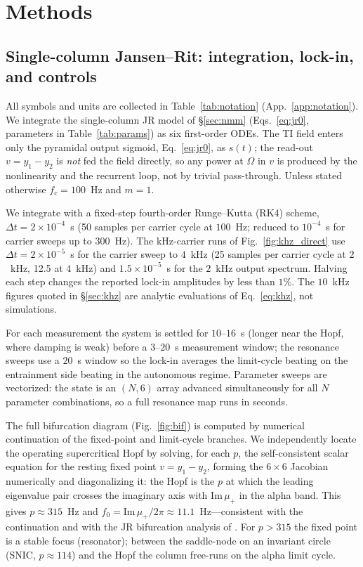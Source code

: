 \documentclass[11pt,a4paper]{article}
\providecommand{\DIFaddtex}[1]{{\protect\color{blue} \sf #1}} %
\providecommand{\DIFdeltex}[1]{{\protect\color{red} \scriptsize #1}} %
\providecommand{\DIFaddbegin}{} %
\providecommand{\DIFaddend}{} %
\providecommand{\DIFdelbegin}{} %
\providecommand{\DIFdelend}{} %
\providecommand{\DIFadd}[1]{\texorpdfstring{\DIFaddtex{#1}}{#1}} %
\providecommand{\DIFdel}[1]{\texorpdfstring{\DIFdeltex{#1}}{}} %
\begin{document}

\section{Methods}

\subsection{Single-column Jansen--Rit: integration, lock-in, and controls}
All symbols and units are collected in Table~\ref{tab:notation}
(App.~\ref{app:notation}). We integrate the single-column JR model of \S\ref{sec:nmm}
(Eqs.~\eqref{eq:jr0}, parameters in Table~\ref{tab:params}) as six first-order
ODEs. The TI field enters only the pyramidal output sigmoid, Eq.~\eqref{eq:jr0},
as $s(t)$; the read-out $v=y_1-y_2$ is \emph{not} fed the field directly, so any
power at $\Omega$ in $v$ is produced by the nonlinearity and the recurrent loop,
not by trivial pass-through. Unless stated otherwise $f_c=100$~Hz and $m=1$.

We integrate with a fixed-step fourth-order Runge--Kutta (RK4) scheme,
$\Delta t=2\times10^{-4}$~s (50 samples per carrier cycle at $100$~Hz; reduced to
$10^{-4}$~s for carrier sweeps up to $300$~Hz). The kHz-carrier runs of
Fig.~\ref{fig:khz_direct} use $\Delta t=2\times10^{-5}$~s for the carrier sweep to
$4$~kHz (25 samples per carrier cycle at $2$~kHz, 12.5 at $4$~kHz) and
$1.5\times10^{-5}$~s for the $2$~kHz output spectrum. Halving each step changes the
reported lock-in amplitudes by less than $1\%$. The $10$~kHz figures quoted in
\S\ref{sec:khz} are analytic evaluations of Eq.~\eqref{eq:khz}, not simulations.

For each measurement the system is settled for $10$--$16$~s (longer near the Hopf, where damping is weak) before a
$3$--$20$~s measurement window; the resonance sweeps use a $20$~s window so the
lock-in averages the \DIFdelbegin \DIFdel{limit-cycle beating on the entrainment side}\DIFdelend \DIFaddbegin \DIFadd{beating in the autonomous regime}\DIFaddend . Parameter
sweeps are vectorized: the state is an
$(N,6)$ array advanced simultaneously for all $N$ parameter combinations, so a full
resonance map runs in seconds.

The full bifurcation diagram (Fig.~\ref{fig:bif}) is computed by numerical continuation of
the fixed-point and limit-cycle branches. We independently locate the operating
supercritical Hopf by solving, for each $p$, the self-consistent scalar equation for the
resting fixed point $v=y_1-y_2$, forming the $6\times6$ Jacobian numerically and
diagonalizing it: the Hopf is the $p$ at which the leading eigenvalue pair crosses the
imaginary axis with $\mathrm{Im}\,\mu_+$ in the alpha band. This gives $p\approx315$~Hz
and $f_0=\mathrm{Im}\,\mu_+/2\pi\approx11.1$~Hz---consistent with the continuation and
with the JR bifurcation analysis of \cite{grimbert2006}. For $p>315$ the fixed point is a
stable focus (resonator); between the saddle-node on an invariant circle (SNIC,
$p\!\approx\!114$) and the Hopf the column free-runs on the alpha limit cycle.
\end{document}
